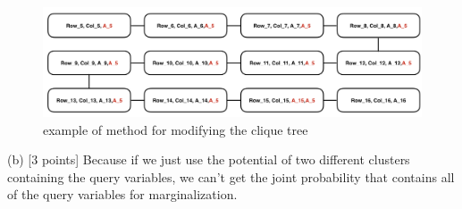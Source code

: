 \documentclass[letterpaper, 11pt]{article}
\begin{document}
\begin{figure}[hbtp]
\centering
\includegraphics[scale=0.5]{clique.png}
\caption{example of method for modifying the clique tree}
\end{figure}

(b) [3 points]
Because if we just use the potential of two different clusters containing the query variables, we can't get the joint probability that contains all of the query variables for marginalization.
\end{document}
